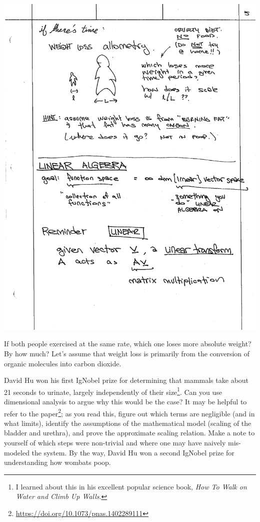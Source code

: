 \begin{center}
\includegraphics[width=.4\textwidth]{figures/lec01_allometry.pdf}
\end{center}

\begin{exercise}
If both people exercised at the same rate, which one loses more absolute weight? By how much? Let’s assume that weight loss is primarily from the conversion of organic molecules into carbon dioxide. 
\end{exercise}


\begin{exercise}
David Hu won his first IgNobel prize for determining that mammals take about 21 seconds to urinate, largely independently of their size\footnote{I learned about this in his excellent popular science book, \emph{How To Walk on Water and Climb Up Walls}.}. Can you use dimensional analysis to argue why this would be the case? It may be helpful to refer to the paper\footnote{\url{https://doi.org/10.1073/pnas.1402289111}}; as you read this, figure out which terms are negligible (and in what limits), identify the assumptions of the mathematical model (scaling of the bladder and urethra), and prove the approximate scaling relation. Make a note to yourself of which steps were non-trivial and where one may have naively mis-modeled the system. By the way, David Hu won a second IgNobel prize for understanding how wombats poop.
\end{exercise}
